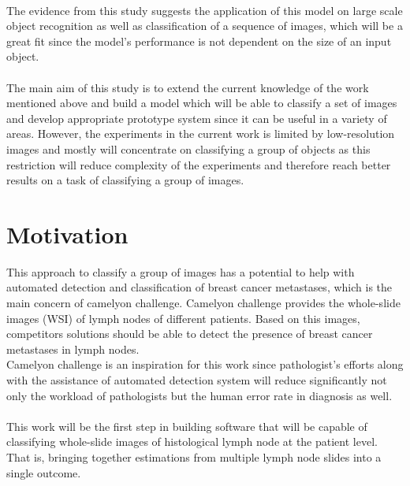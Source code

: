  \paragraph{} The evidence from this study suggests the application of this model on large scale
 object recognition as well as classification of a sequence of images, which will
 be a great fit since the model's performance is not dependent on the size of an input object.

 \paragraph{} The main aim of this study is to extend the current knowledge of the work mentioned
 above and build a model which will be able to classify a set of images and develop appropriate
 prototype system since it can be useful in a variety of areas. However,
 the experiments in the current work is limited by low-resolution images and mostly will concentrate
 on classifying a group of objects as this restriction will reduce complexity
 of the experiments and therefore reach better results on a task of classifying
 a group of images.

\section{Motivation}
This approach to classify a group of images has a potential to help with automated
detection and classification of breast cancer metastases, which is the main concern
of camelyon challenge. Camelyon challenge provides the whole-slide images (WSI)
of lymph nodes of different patients. Based on this images, competitors solutions
should be able to
detect the presence of breast cancer metastases in lymph nodes. \cite{CAMEL}
\\
Camelyon challenge is an inspiration for this work since pathologist's efforts
along with the assistance of automated detection system will reduce significantly
not only the workload of pathologists but the human error rate in diagnosis as well.

\paragraph{}
This work will be the first step in building software that will be capable of
classifying whole-slide images of histological lymph node at the patient level.
That is, bringing together estimations from multiple lymph node slides into a single outcome.

